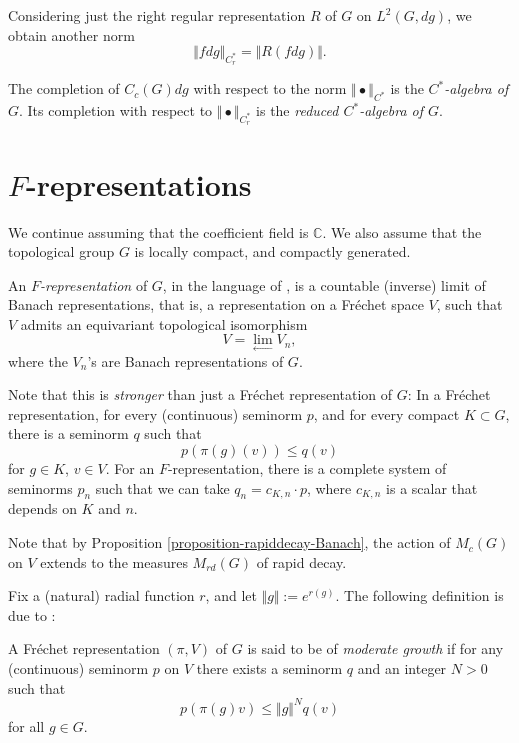 Considering just the right regular representation $R$ of $G$ on $L^2(G,dg)$, we obtain another norm
$$ \Vert fdg \Vert_{C_r^*} = \Vert R(fdg)\Vert.$$

\begin{definition}
\label{definition-Cstar}
The completion of $C_c(G) dg$ with respect to the norm $\Vert\bullet\Vert_{C^*}$ is the {\it $C^*$-algebra of $G$}. Its completion with respect to $\Vert\bullet \Vert_{C_r^*}$ is the {\it reduced $C^*$-algebra of $G$}.
\end{definition}

\section{$F$-representations}
\label{section-Frepresentations}

We continue assuming that the coefficient field is $\mathbb C$. We also assume that the topological group $G$ is locally compact, and compactly generated. 

\begin{definition}
\label{definition-Frepresentation}
An {\it $F$-representation} of $G$, in the language of 
\cite{Bernstein-Kroetz}, 
is a countable (inverse) limit of Banach representations, that is, a representation on a Fr\'echet space $V$, such that $V$ admits an equivariant topological isomorphism 
$$ 
V = \lim_{\leftarrow} V_n,
$$
where the $V_n$'s are Banach representations of $G$.
\end{definition}
 
Note that this is {\it stronger} than just a Fr\'echet representation of $G$: In a Fr\'echet representation, for every (continuous) seminorm $p$, and for every compact $K\subset G$, there is a seminorm $q$ such that 
$$ p(\pi(g) (v)) \le q(v)$$
for $g\in K$, $v\in V$. For an $F$-representation, there is a complete system of seminorms $p_n$ such that we can take $q_n=c_{K,n}\cdot p$, where $c_{K,n}$ is a scalar that depends on $K$ and $n$.

Note that by Proposition \ref{proposition-rapiddecay-Banach}, the action of $M_c(G)$ on $V$ extends to the measures $M_{rd}(G)$ of rapid decay. 

Fix a (natural) radial function $r$, and let $\Vert g\Vert:= e^{r(g)}$. The following definition is due to \cite{Casselman-canonicalextensions}:

\begin{definition}
\label{definition-moderate-growth}
A Fr\'echet representation $(\pi,V)$ of $G$ is said to be of {\it moderate
growth} if for any (continuous) seminorm $p$ on $V$ there exists a seminorm $q$
and an integer $N > 0$ such that
$$
p(\pi(g)v) \le \Vert g\Vert^N q(v)
$$
for all $g \in G$.
\end{definition}

